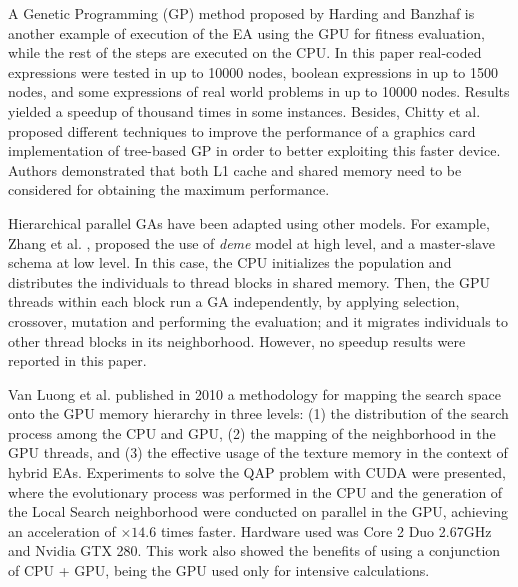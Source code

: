 \documentclass{article}
\begin{document}
A Genetic Programming (GP) method proposed by Harding and Banzhaf \cite{4215552} is another example of execution of the EA using the GPU for fitness evaluation, while the rest of the steps are executed on the CPU. In this paper real-coded expressions were tested in up to 10000 nodes, boolean expressions in up to 1500 nodes, and some expressions of real world problems in up to 10000 nodes. Results yielded a speedup of thousand times in some instances.
Besides, Chitty et al. \cite{Chitty2016} proposed different techniques to improve the performance of a graphics card implementation of tree-based GP in order to better exploiting this faster device. Authors demonstrated that both L1 cache and shared memory need to be considered for obtaining the maximum performance.

Hierarchical parallel GAs have been adapted using other models. For example, Zhang et al. \cite{ZhangImplementationserverClient}, proposed the use of {\em deme} model at high level, and a master-slave schema at low level. In this case, the CPU initializes the population and distributes the individuals to thread blocks in shared memory. Then, the GPU threads within each block run a GA independently, by applying selection, crossover, mutation and performing the evaluation; and it migrates individuals to other thread blocks in its neighborhood. However, no speedup results were reported in this paper.

Van Luong et al. \cite{5586403} published in 2010 a methodology for mapping the search space onto the GPU memory hierarchy in three levels: (1) the distribution of the search process among the CPU and GPU, (2) the mapping of the neighborhood in the GPU threads, and (3) the effective usage of the texture memory in the context of hybrid EAs. Experiments to solve the QAP problem with CUDA were presented, where the evolutionary process was performed in the CPU and the generation of the Local Search neighborhood were conducted on parallel in the GPU, achieving an acceleration of $\times14.6$ times faster. Hardware used was Core 2 Duo 2.67GHz and Nvidia GTX 280. This work also showed the benefits of using a conjunction of CPU + GPU, being the GPU used only for intensive calculations.

\end{document}
